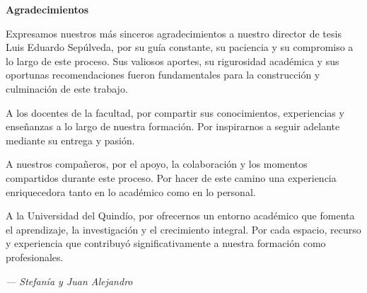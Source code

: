 \cleardoublepage%
%
\thispagestyle{empty}

\vspace*{\fill} %

\begin{center}
{\Large\bfseries Agradecimientos}
\end{center}

\vspace{2cm}

{\centering
{\itshape

    Expresamos nuestros más sinceros agradecimientos a nuestro director de tesis Luis Eduardo Sepúlveda, por su guía constante, su paciencia y su compromiso a lo largo de este proceso. Sus valiosos aportes, su rigurosidad académica y sus oportunas recomendaciones fueron fundamentales para la construcción y culminación de este trabajo.

    A los docentes de la facultad, por compartir sus conocimientos, experiencias y enseñanzas a lo largo de nuestra formación. Por inspirarnos a seguir adelante mediante su entrega y pasión.

    A nuestros compañeros, por el apoyo, la colaboración y los momentos compartidos durante este proceso. Por hacer de este camino una experiencia enriquecedora tanto en lo académico como en lo personal.
    
    A la Universidad del Quindío, por ofrecernos un entorno académico que fomenta el aprendizaje, la investigación y el crecimiento integral. Por cada espacio, recurso y experiencia que contribuyó significativamente a nuestra formación como profesionales.

}

\vspace{2cm}

\hfill \textit{--- Stefanía y Juan Alejandro}

}

\vspace*{\fill} %